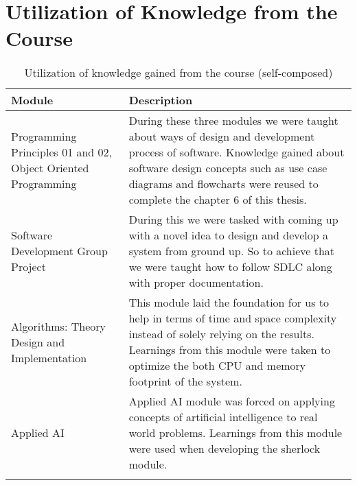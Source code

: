 \section{Utilization of Knowledge from the Course}


\begin{longtable}{|p{50mm}|p{105mm}|}
    \hline
    \textbf{Module} & \textbf{Description} \\ \hline
    Programming Principles 01 and 02, Object Oriented Programming & During these three modules we were taught about ways of design and development process of software. Knowledge gained about software design concepts such as use case diagrams and flowcharts were reused to complete the chapter 6 of this thesis. \\ \hline
    Software Development Group Project & During this we were tasked with coming up with a novel idea to design and develop a system from ground up. So to achieve that we were taught how to follow SDLC along with proper documentation. \\ \hline
    Algorithms: Theory Design and Implementation & This module laid the foundation for us to help in terms of time and space complexity instead of solely relying on the results. Learnings from this module were taken to optimize the both CPU and memory footprint of the system. \\ \hline
    Applied AI & Applied AI module was forced on applying concepts of artificial intelligence to real world problems. Learnings from this module were used when developing the \ac{sherlock} module. \\ \hline    
    \caption{Utilization of knowledge gained from the course (self-composed)}
  \end{longtable}
  